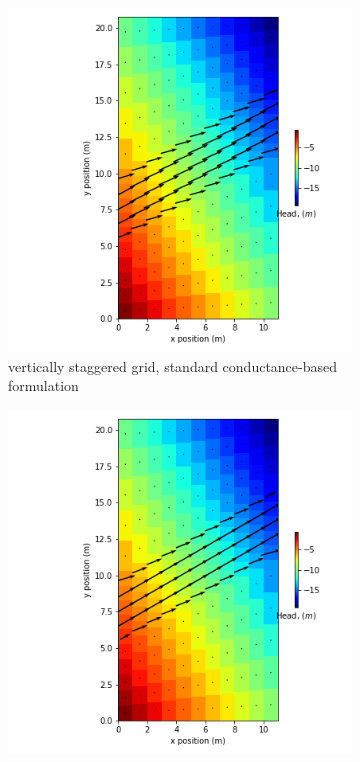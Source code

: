 \documentclass{article}
\begin{document}
\begin{figure}[H]
\centering
\begin{subfigure}{0.4\textwidth}
	\includegraphics[width=\textwidth]{../figures/disu-d-af-vs-s-head.png}
	\caption{vertically staggered grid, standard conductance-based formulation}
	\label{fig:disu-s-cc-head}
\end{subfigure}
\hfill
\begin{subfigure}{0.4\textwidth}
	\includegraphics[width=\textwidth]{../figures/disu-d-af-vs-x-head.png}

\end{subfigure}
\end{figure}
\end{document}
